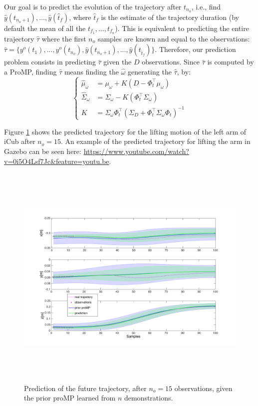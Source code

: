 Our goal is to predict the evolution of the trajectory after $t_{n_o}$, i.e., find $\hat{y}(t_{n_o+1}),\ldots,\hat{y}(\hat{t}_f)$, where $\hat{t}_f$ is the estimate of the trajectory duration (by default the mean of all the $t_{f_1}, \ldots, t_{f_n}$). 
This is equivalent to predicting the entire trajectory $\hat{\tau}$ where the first $n_o$ samples are known and equal to the observations: $\hat{\tau} = \{y^o(t_{1}), ..., y^o(t_{n_o}), \hat{y}(t_{n_o+1}), ..., \hat{y}(t_{\hat{t}_f})\}$.
Therefore, our prediction problem consists in predicting $\hat{\tau}$ given the $D$ observations. Since $\hat{\tau}$ is computed by a ProMP, finding $\hat{\tau}$ means finding the $\hat{\omega}$ generating the  $\hat{\tau}$, by:
$$\left\{
\begin{array}{rl}
\hat{\mu}_\omega &= \mu_\omega + K(D - \Phi_t^\top \mu_\omega) \\ 
\hat{\Sigma}_\omega &= \Sigma_\omega - K(\Phi_t^\top \Sigma_\omega) \\
K&= \Sigma_\omega\Phi_t^\top(\Sigma_D + \Phi_t^\top\Sigma_\omega \Phi_t)^{-1}
\end{array}
\right.$$

Figure \ref{fig:predictionLifting15} shows the predicted trajectory for the lifting motion of the left arm of iCub after $n_{o}=15$. An example of the predicted trajectory for lifting the arm in Gazebo can be seen here: \url{https://www.youtube.com/watch?v=0i5O4Lsf7Jc&feature=youtu.be}.




\begin{figure}[h]
\centering
\includegraphics[height=11cm]{figs/proMP_prediction.pdf}
\caption{Prediction of the future trajectory, after $n_o=15$ observations, given the prior proMP learned from $n$ demonstrations.}
\label{fig:predictionLifting15}
\end{figure}









